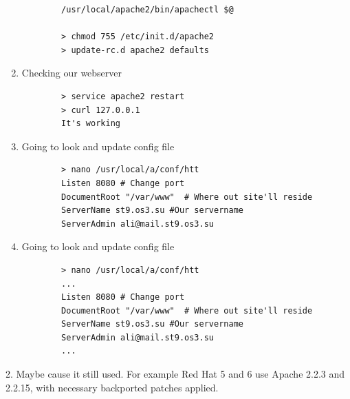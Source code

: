 \documentclass[10pt]{article}
\begin{document}
\begin{enumerate}
\begin{verbatim}
        /usr/local/apache2/bin/apachectl $@

        > chmod 755 /etc/init.d/apache2
        > update-rc.d apache2 defaults
    \end{verbatim}
    \item Checking our webserver
    \begin{verbatim}
        > service apache2 restart
        > curl 127.0.0.1
        It's working
    \end{verbatim}
    \item Going to look and update config file
    \begin{verbatim}
        > nano /usr/local/a/conf/htt
        Listen 8080 # Change port
        DocumentRoot "/var/www"  # Where out site'll reside
        ServerName st9.os3.su #Our servername
        ServerAdmin ali@mail.st9.os3.su
    \end{verbatim}
    \item Going to look and update config file
    \begin{verbatim}
        > nano /usr/local/a/conf/htt
        ...
        Listen 8080 # Change port
        DocumentRoot "/var/www"  # Where out site'll reside
        ServerName st9.os3.su #Our servername
        ServerAdmin ali@mail.st9.os3.su
        ...
    \end{verbatim}
\end{enumerate}

2. Maybe cause it still used. For example Red Hat 5 and 6 use Apache 2.2.3 and 2.2.15, with necessary backported patches applied. \cite{redhat}
\end{document}
